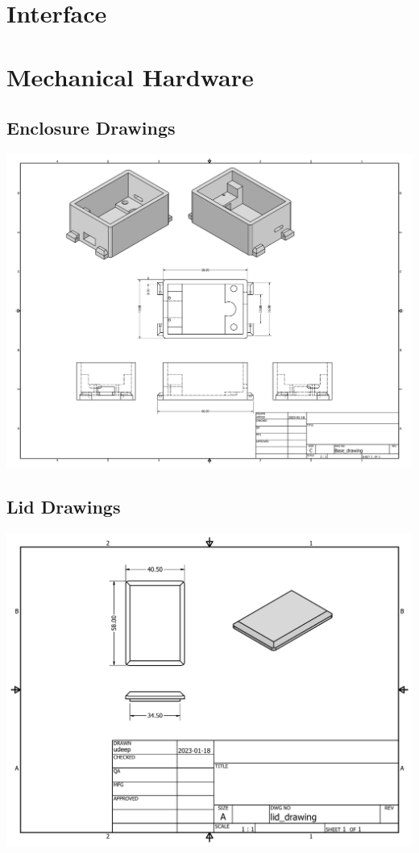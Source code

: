 \documentclass[12pt, titlepage]{article}
\begin{document}
\begin{appendices}
  \section{Interface}
  \label{appendix:interface}
  
  \section{Mechanical Hardware}
  \label{appendix:hardware}
\subsection{Enclosure Drawings}
  \begin{center}
	\label{appendix:hardware:enclosureDWG}
  \includegraphics[width=\textwidth,height=\textheight,keepaspectratio]{Base_drawing.pdf}
\end{center}
\subsection{Lid Drawings}
	\label{appendix:hardware:lidDWG}

  \includegraphics[width=\textwidth,height=\textheight,keepaspectratio]{Lid_drawing.pdf}

\end{appendices}
\end{document}
